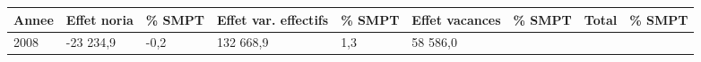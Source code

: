 \begin{longtable}[]{@{}lllllllll@{}}
\toprule
\begin{minipage}[b]{0.05\columnwidth}\raggedright
Annee\strut
\end{minipage} & \begin{minipage}[b]{0.10\columnwidth}\raggedright
Effet noria\strut
\end{minipage} & \begin{minipage}[b]{0.06\columnwidth}\raggedright
\% SMPT\strut
\end{minipage} & \begin{minipage}[b]{0.17\columnwidth}\raggedright
Effet var. effectifs\strut
\end{minipage} & \begin{minipage}[b]{0.06\columnwidth}\raggedright
\% SMPT\strut
\end{minipage} & \begin{minipage}[b]{0.12\columnwidth}\raggedright
Effet vacances\strut
\end{minipage} & \begin{minipage}[b]{0.06\columnwidth}\raggedright
\% SMPT\strut
\end{minipage} & \begin{minipage}[b]{0.08\columnwidth}\raggedright
Total\strut
\end{minipage} & \begin{minipage}[b]{0.06\columnwidth}\raggedright
\% SMPT\strut
\end{minipage}\tabularnewline
\midrule
\endhead
\begin{minipage}[t]{0.05\columnwidth}\raggedright
2008\strut
\end{minipage} & \begin{minipage}[t]{0.10\columnwidth}\raggedright
-23 234,9\strut
\end{minipage} & \begin{minipage}[t]{0.06\columnwidth}\raggedright
-0,2\strut
\end{minipage} & \begin{minipage}[t]{0.17\columnwidth}\raggedright
132 668,9\strut
\end{minipage} & \begin{minipage}[t]{0.06\columnwidth}\raggedright
1,3\strut
\end{minipage} & \begin{minipage}[t]{0.12\columnwidth}\raggedright
58 586,0\strut
\end{minipage} & \begin{minipage}[t]{0.06\columnwidth}\raggedright

\end{minipage}
\end{longtable}
